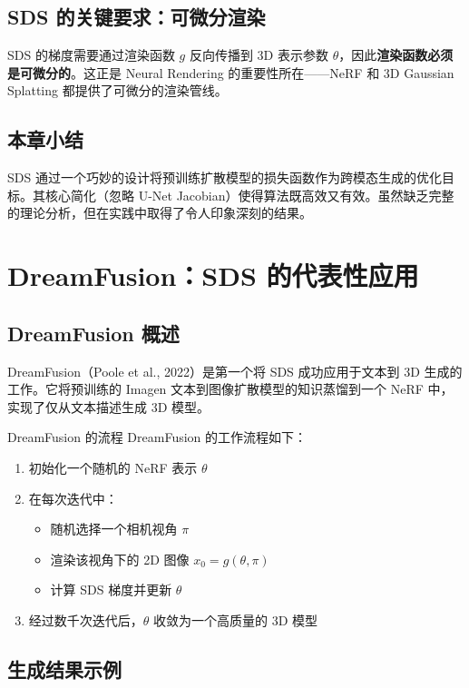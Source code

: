 \documentclass[a4paper]{article}
\begin{document}
\subsection{SDS 的关键要求：可微分渲染}

SDS 的梯度需要通过渲染函数 $g$ 反向传播到 3D 表示参数 $\theta$，因此\textbf{渲染函数必须是可微分的}。这正是 Neural Rendering 的重要性所在——NeRF 和 3D Gaussian Splatting 都提供了可微分的渲染管线。

\subsection{本章小结}

SDS 通过一个巧妙的设计将预训练扩散模型的损失函数作为跨模态生成的优化目标。其核心简化（忽略 U-Net Jacobian）使得算法既高效又有效。虽然缺乏完整的理论分析，但在实践中取得了令人印象深刻的结果。

\newpage
\section{DreamFusion：SDS 的代表性应用}

\subsection{DreamFusion 概述}

DreamFusion（Poole et al., 2022）是第一个将 SDS 成功应用于文本到 3D 生成的工作。它将预训练的 Imagen 文本到图像扩散模型的知识蒸馏到一个 NeRF 中，实现了仅从文本描述生成 3D 模型。

\begin{importantbox}{DreamFusion 的流程}
DreamFusion 的工作流程如下：
\begin{enumerate}
    \item 初始化一个随机的 NeRF 表示 $\theta$
    \item 在每次迭代中：
    \begin{itemize}
        \item 随机选择一个相机视角 $\pi$
        \item 渲染该视角下的 2D 图像 $x_0 = g(\theta, \pi)$
        \item 计算 SDS 梯度并更新 $\theta$
    \end{itemize}
    \item 经过数千次迭代后，$\theta$ 收敛为一个高质量的 3D 模型
\end{enumerate}
\end{importantbox}

\subsection{生成结果示例}
\end{document}
